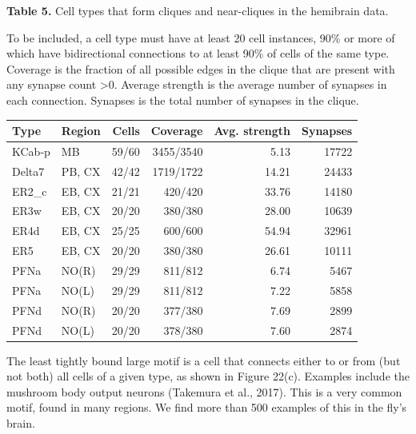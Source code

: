 \documentclass{article}
\begin{document}
\noindent \textbf{Table 5.} Cell types that form cliques and near-cliques in the hemibrain data.

\noindent To be included, a cell type must have at least 20 cell instances, 90\% or more of which have bidirectional connections to at least 90\% of cells of the same type. Coverage is the fraction of all possible edges in the clique that are present with any synapse count >0. Average strength is the average number of synapses in each connection. Synapses is the total number of synapses in the clique.
\begin{center}\footnotesize
\begin{longtable}{llrrrr}
\textbf{Type} & \textbf{Region} & \textbf{Cells} & \textbf{Coverage} & \textbf{Avg. strength} & \textbf{Synapses} \\
\hline
KCab-p & MB & 59/60 & 3455/3540 & 5.13 & 17722 \\
Delta7 & PB, CX & 42/42 & 1719/1722 & 14.21 & 24433 \\
ER2\_c & EB, CX & 21/21 & 420/420 & 33.76 & 14180 \\
ER3w & EB, CX & 20/20 & 380/380 & 28.00 & 10639 \\
ER4d & EB, CX & 25/25 & 600/600 & 54.94 & 32961 \\
ER5 & EB, CX & 20/20 & 380/380 & 26.61 & 10111 \\
PFNa & NO(R) & 29/29 & 811/812 & 6.74 & 5467 \\
PFNa & NO(L) & 29/29 & 811/812 & 7.22 & 5858 \\
PFNd & NO(R) & 20/20 & 377/380 & 7.69 & 2899 \\
PFNd & NO(L) & 20/20 & 378/380 & 7.60 & 2874 \\
\end{longtable}
\end{center}


The least tightly bound large motif is a cell that connects either to or from (but not both) all cells of a given type, as shown in Figure 22(c). Examples include the mushroom body output neurons (Takemura et al., 2017). This is a very common motif, found in many regions. We find more than 500 examples of this in the fly’s brain.
\end{document}
